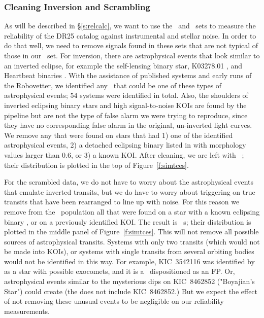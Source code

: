 \subsubsection{Cleaning Inversion and Scrambling}
\label{s:clean}
As will be described in \S\ref{s:relcalc}, we want to use the \invtce\ and \scrtce\ sets to measure the reliability of the DR25 catalog against instrumental and stellar noise. In order to do that well, we need to remove signals found in these sets that are not typical of those in our \opstce\ set. For inversion, there are astrophysical events that look similar to an inverted eclipse, for example the self-lensing binary star, K03278.01 \citep{Kruse2014}, and Heartbeat binaries \citep{Thompson2012}. With the assistance of published systems and early runs of the Robovetter, we identified any \invtce\ that could be one of these types of astrophysical events; 54 systems were identified in total. Also, the shoulders of inverted eclipsing binary stars and high signal-to-noise KOIs are found by the pipeline but are not the type of false alarm we were trying to reproduce, since they have no corresponding false alarm in the original, un-inverted light curves. We remove any  that were found on stars that had 1) one of the identified astrophysical events, 2) a detached eclipsing binary listed in \citet{Kirk2016} with morphology values larger than 0.6, or 3) a known KOI.  After cleaning, we are left with \ninvtces\ ; their distribution is plotted in the top of Figure~\ref{f:simtces}.

For the scrambled data, we do not have to worry about the astrophysical events that emulate inverted transits, but we do have to worry about triggering on true transits that have been rearranged to line up with noise. For this reason we remove from the \scrtce\ population all that were found on a star with a known eclipsing binary \citep{Kirk2016}, or on a previously identified KOI.  The result is \nscrtces\ \scrtce s; their distribution is plotted in the middle panel of Figure~\ref{f:simtces}. 
{\color{blue}This will not remove all possible sources of astrophysical transits. Systems with only two transits (which would not be made into KOIs), or systems with single transits from several orbiting bodies would not be identified in this way. For example, KIC~3542116 was identified by \citet{Rappaport2017} as a star with possible exocomets, and it is a \scrtce\ dispositioned as an FP. Or, astrophysical events similar to the mysterious dips on KIC~8462852 ("Boyajian's Star") \citep{Boyajian2016} could create  (the  does not include KIC~8462852.) But we expect the effect of not removing these unusual events to be negligible on our reliability measurements.
}

